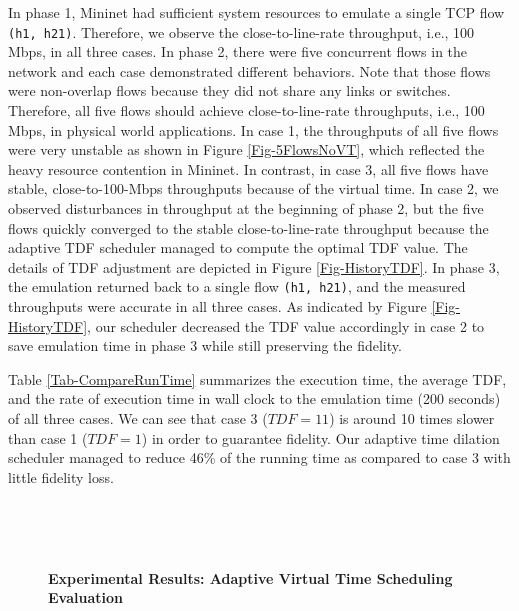 In phase 1, Mininet had sufficient system resources to emulate a single TCP flow \texttt{(h1, h21)}. Therefore, we observe the close-to-line-rate throughput, i.e., 100 Mbps, in all three cases. In phase 2, there were five concurrent flows in the network and each case demonstrated different behaviors. Note that those flows were non-overlap flows because they did not share any links or switches. Therefore, all five flows should achieve close-to-line-rate throughputs, i.e., 100 Mbps, in physical world applications.
In case 1, the throughputs of all five flows were very unstable as shown in Figure \ref{Fig-5FlowsNoVT}, which reflected the heavy resource contention in Mininet. In contrast, in case 3, all five flows have stable, close-to-100-Mbps throughputs because of the virtual time. In case 2, we observed disturbances in throughput at the beginning of phase 2, but the five flows quickly converged to the stable close-to-line-rate throughput because the adaptive TDF scheduler managed to compute the optimal TDF value. The details of TDF adjustment are depicted in Figure \ref{Fig-HistoryTDF}. In phase 3, the emulation returned back to a single flow \texttt{(h1, h21)}, and the measured throughputs were accurate in all three cases.
As indicated by Figure \ref{Fig-HistoryTDF}, our scheduler decreased the TDF value accordingly in case 2 to save emulation time in phase 3 while still preserving the fidelity. 

Table \ref{Tab-CompareRunTime} summarizes the execution time, the average TDF, and the rate of execution time in wall clock to the emulation time (200 seconds) of all three cases. 
We can see that case 3 ($TDF = 11$) is around 10 times slower than case 1 ($TDF = 1$) in order to guarantee fidelity. Our adaptive time dilation scheduler managed to reduce 46\% of the running time as compared to case 3 with little fidelity loss. 

\begin{figure*}
\centering
	~
	
	~
\caption{\textbf{Experimental Results: Adaptive Virtual Time Scheduling Evaluation}}
\label{Fig-Adaptive}
\end{figure*}

